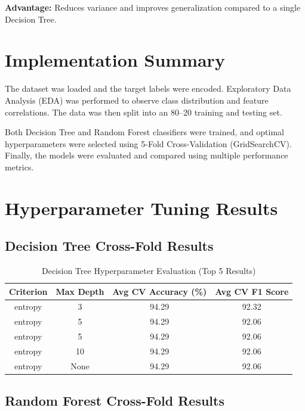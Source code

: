 \documentclass[11pt]{article}
\begin{document}
\textbf{Advantage:}  
Reduces variance and improves generalization compared to a single Decision Tree.

\section*{Implementation Summary}

The dataset was loaded and the target labels were encoded. Exploratory Data Analysis (EDA) was performed to observe class distribution and feature correlations. The data was then split into an 80--20 training and testing set.

Both Decision Tree and Random Forest classifiers were trained, and optimal hyperparameters were selected using 5-Fold Cross-Validation (GridSearchCV). Finally, the models were evaluated and compared using multiple performance metrics.



\section*{Hyperparameter Tuning Results}

\subsection*{Decision Tree Cross-Fold Results}

\begin{table}[H]
\centering
\caption{Decision Tree Hyperparameter Evaluation (Top 5 Results)}
\renewcommand{\arraystretch}{1.3}
\begin{tabular}{cccc}
\toprule
Criterion & Max Depth & Avg CV Accuracy (\%) & Avg CV F1 Score \\
\midrule
entropy & 3 & 94.29 & 92.32 \\
entropy & 5 & 94.29 & 92.06 \\
entropy & 5 & 94.29 & 92.06 \\
entropy & 10 & 94.29 & 92.06 \\
entropy & None & 94.29 & 92.06 \\
\bottomrule
\end{tabular}
\end{table}

\subsection*{Random Forest Cross-Fold Results}
\end{document}
